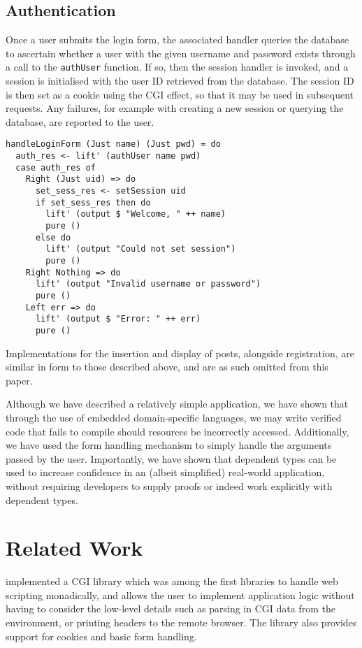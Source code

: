 \documentclass[preprint]{sigplanconf}
\begin{document}
\subsection{Authentication}
Once a user submits the login form, the associated handler queries the database to ascertain whether a user with the given username and password exists through a call to the \texttt{authUser} function. If so, then the session handler is invoked, and a session is initialised with the user ID retrieved from the database. The session ID is then set as a cookie using the CGI effect, so that it may be used in subsequent requests. Any failures, for example with creating a new session or querying the database, are reported to the user.
\begin{Verbatim}
handleLoginForm (Just name) (Just pwd) = do
  auth_res <- lift' (authUser name pwd)
  case auth_res of
    Right (Just uid) => do
      set_sess_res <- setSession uid
      if set_sess_res then do
        lift' (output $ "Welcome, " ++ name)
        pure ()
      else do
        lift' (output "Could not set session")
        pure ()
    Right Nothing => do
      lift' (output "Invalid username or password")
      pure ()
    Left err => do
      lift' (output $ "Error: " ++ err)
      pure ()
\end{Verbatim}
Implementations for the insertion and display of posts, alongside registration, are similar in form to those described above, and are as such omitted from this paper.

Although we have described a relatively simple application, we have shown that through the use of embedded domain-specific languages, we may write verified code that fails to compile should resources be incorrectly accessed. Additionally, we have used the form handling mechanism to simply handle the arguments passed by the user. Importantly, we have shown that dependent types can be used to increase confidence in an (albeit simplified) real-world application, without requiring developers to supply proofs or indeed work explicitly with dependent types. 

\section{Related Work}
\citet{meijer:cgi} implemented a CGI library which was among the first libraries to handle web scripting monadically, and allows the user to implement application logic without having to consider the low-level details such as parsing in CGI data from the environment, or printing headers to the remote browser. The library also provides support for cookies and basic form handling. 
\end{document}
